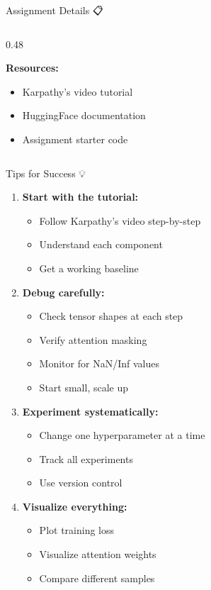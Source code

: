 \documentclass[aspectratio=169]{beamer}
\begin{document}
\begin{frame}{Assignment Details 📋}
\begin{columns}[T]
\begin{column}{0.48\textwidth}
\vspace{0.5em}

\textbf{Resources:}
\begin{itemize}
    \item Karpathy's video tutorial
    \item HuggingFace documentation
    \item Assignment starter code
\end{itemize}
\end{column}
\end{columns}
\end{frame}

\begin{frame}{Tips for Success 💡}
\begin{enumerate}
    \item \textbf{Start with the tutorial:}
    \begin{itemize}
        \item Follow Karpathy's video step-by-step
        \item Understand each component
        \item Get a working baseline
    \end{itemize}

    \item \textbf{Debug carefully:}
    \begin{itemize}
        \item Check tensor shapes at each step
        \item Verify attention masking
        \item Monitor for NaN/Inf values
        \item Start small, scale up
    \end{itemize}

    \item \textbf{Experiment systematically:}
    \begin{itemize}
        \item Change one hyperparameter at a time
        \item Track all experiments
        \item Use version control
    \end{itemize}

    \item \textbf{Visualize everything:}
    \begin{itemize}
        \item Plot training loss
        \item Visualize attention weights
        \item Compare different samples
    \end{itemize}


\end{enumerate}
\end{frame}
\end{document}
